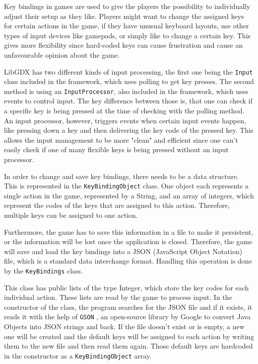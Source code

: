 \documentclass[12p]{article}
\begin{document}
Key bindings in games are used to give the players the possibility to individually adjust their setup as they like. Players might want to change the assigned keys for certain actions in the game, if they have unusual keyboard layouts, use other types of input devices like gamepads, or simply like to change a certain key. This gives more flexibility since hard-coded keys can cause frustration and cause an unfavourable opinion about the game.

LibGDX has two different kinds of input processing, the first one being the \texttt{Input} class included in the framework, which uses polling to get key presses. The second method is using an \texttt{InputProcessor}, also included in the framework, which uses events to control input. The key difference between those is, that one can check if a specific key is being pressed at the time of checking with the polling method. An input processor, however, triggers events when certain input events happen, like pressing down a key and then delivering the key code of the pressed key. This allows the input management to be more "clean" and efficient since one can't easily check if one of many flexible keys is being pressed without an input processor.

In order to change and save key bindings, there needs to be a data structure. This is represented in the \texttt{KeyBindingObject} class. One object each represents a single action in the game, represented by a String, and an array of integers, which represent the codes of the keys that are assigned to this action. Therefore, multiple keys can be assigned to one action.

Furthermore, the game has to save this information in a file to make it persistent, or the information will be lost once the application is closed. Therefore, the game will save and load the key bindings into a JSON (JavaScript Object Notation) file, which is a standard data interchange format. Handling this operation is done by the \texttt{KeyBindings} class. 

This class has public lists of the type Integer, which store the key codes for each individual action. These lists are read by the game to process input. In the constructor of the class, the program searches for the JSON file and if it exists, it reads it with the help of \texttt{GSON} \cite{GSON}, an open-source library by Google to convert Java Objects into JSON strings and back. If the file doesn't exist or is empty, a new one will be created and the default keys will be assigned to each action by writing them to the new file and then read them again. Those default keys are hardcoded in the constructor as a \texttt{KeyBindingObject} array.
\end{document}
